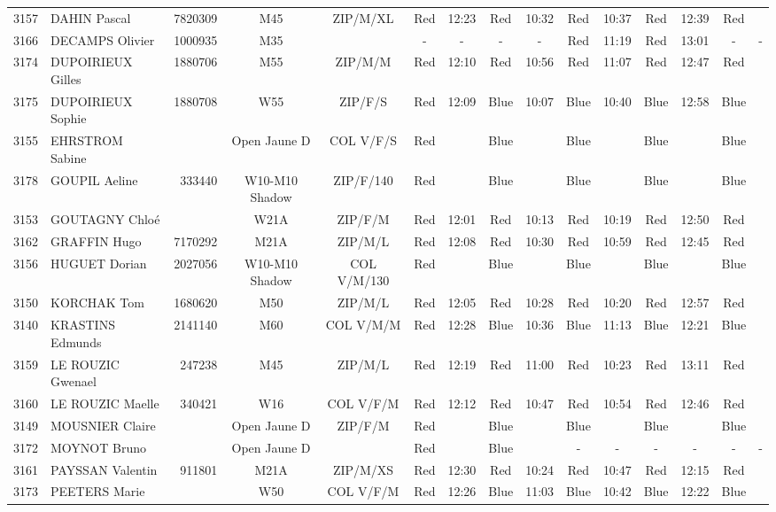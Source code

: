 \documentclass{report}
\begin{document}
\begin{longtable}{|c|l|r|c|c|*{5}{cc|}}
    3157 & DAHIN Pascal & 7820309 & M45 & ZIP/M/XL & Red & 12:23 & Red & 10:32 & Red & 10:37 & Red & 12:39 & Red &  \\
    3166 & DECAMPS Olivier & 1000935 & M35 &   & - &  - & - &  - & Red & 11:19 & Red & 13:01 & - &  -\\
    3174 & DUPOIRIEUX Gilles & 1880706 & M55 & ZIP/M/M & Red & 12:10 & Red & 10:56 & Red & 11:07 & Red & 12:47 & Red &  \\
    3175 & DUPOIRIEUX Sophie & 1880708 & W55 & ZIP/F/S & Red & 12:09 & Blue & 10:07 & Blue & 10:40 & Blue & 12:58 & Blue &  \\
    3155 & EHRSTROM Sabine &  & Open Jaune D & COL V/F/S & Red &   & Blue &   & Blue &   & Blue &   & Blue &  \\
    3178 & GOUPIL Aeline & 333440 & W10-M10 Shadow & ZIP/F/140 & Red &   & Blue &   & Blue &   & Blue &   & Blue &  \\
    3153 & GOUTAGNY Chloé &  & W21A & ZIP/F/M & Red & 12:01 & Red & 10:13 & Red & 10:19 & Red & 12:50 & Red &  \\
    3162 & GRAFFIN Hugo & 7170292 & M21A & ZIP/M/L & Red & 12:08 & Red & 10:30 & Red & 10:59 & Red & 12:45 & Red &  \\
    3156 & HUGUET Dorian & 2027056 & W10-M10 Shadow & COL V/M/130 & Red &   & Blue &   & Blue &   & Blue &   & Blue &  \\
    3150 & KORCHAK Tom & 1680620 & M50 & ZIP/M/L & Red & 12:05 & Red & 10:28 & Red & 10:20 & Red & 12:57 & Red &  \\
    3140 & KRASTINS Edmunds & 2141140 & M60 & COL V/M/M & Red & 12:28 & Blue & 10:36 & Blue & 11:13 & Blue & 12:21 & Blue &  \\
    3159 & LE ROUZIC Gwenael & 247238 & M45 & ZIP/M/L & Red & 12:19 & Red & 11:00 & Red & 10:23 & Red & 13:11 & Red &  \\
    3160 & LE ROUZIC Maelle & 340421 & W16 & COL V/F/M & Red & 12:12 & Red & 10:47 & Red & 10:54 & Red & 12:46 & Red &  \\
    3149 & MOUSNIER Claire &  & Open Jaune D & ZIP/F/M & Red &   & Blue &   & Blue &   & Blue &   & Blue &  \\
    3172 & MOYNOT Bruno &  & Open Jaune D &   & Red &   & Blue &   & - &  - & - &  - & - &  -\\
    3161 & PAYSSAN Valentin & 911801 & M21A & ZIP/M/XS & Red & 12:30 & Red & 10:24 & Red & 10:47 & Red & 12:15 & Red &  \\
    3173 & PEETERS Marie &  & W50 & COL V/F/M & Red & 12:26 & Blue & 11:03 & Blue & 10:42 & Blue & 12:22 & Blue &  \\

\end{longtable}
\end{document}
